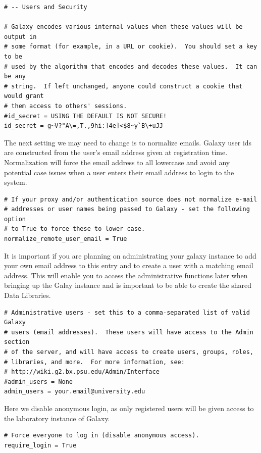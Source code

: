 \documentclass[a4paper,10pt]{article}
\begin{document}
\begin{lstlisting}
# -- Users and Security

# Galaxy encodes various internal values when these values will be output in
# some format (for example, in a URL or cookie).  You should set a key to be
# used by the algorithm that encodes and decodes these values.  It can be any
# string.  If left unchanged, anyone could construct a cookie that would grant
# them access to others' sessions.
#id_secret = USING THE DEFAULT IS NOT SECURE!
id_secret = g~V?"A\=,T.,9hi:]4e]<$8~y`B\+uJJ
\end{lstlisting}

The next setting we may need to change is to normalize emails.  Galaxy user ids are constructed from the user's email address given at registration time.  Normalization will force the email address to all lowercase and avoid any potential case issues when a user enters their email address to login to the system.

\begin{lstlisting}
# If your proxy and/or authentication source does not normalize e-mail
# addresses or user names being passed to Galaxy - set the following option
# to True to force these to lower case.
normalize_remote_user_email = True
\end{lstlisting}

It is important if you are planning on administrating your galaxy instance to add your own email address to this entry and to create a user with a matching email address.  This will enable you to access the administrative functions later when bringing up the Galay instance and is important to be able to create the shared Data Libraries.
\begin{lstlisting}
# Administrative users - set this to a comma-separated list of valid Galaxy
# users (email addresses).  These users will have access to the Admin section
# of the server, and will have access to create users, groups, roles,
# libraries, and more.  For more information, see:
# http://wiki.g2.bx.psu.edu/Admin/Interface
#admin_users = None
admin_users = your.email@university.edu
\end{lstlisting}

Here we disable anonymous login, as only registered users will be given access to the laboratory instance of Galaxy.
\begin{lstlisting}
# Force everyone to log in (disable anonymous access).
require_login = True
\end{lstlisting}
\end{document}
